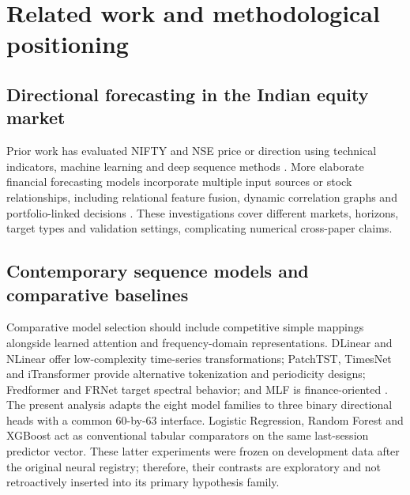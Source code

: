 \documentclass[fleqn,10pt]{wlscirep}
\begin{document}
\section{Related work and methodological positioning}\label{sec:related}
\subsection{Directional forecasting in the Indian equity market}
Prior work has evaluated NIFTY and NSE price or direction using technical indicators, machine learning and deep sequence methods \cite{Paul2023,Agrawal2021,Barua2024,Shastry2024Intraday,Kadu2025SearchRescue}. More elaborate financial forecasting models incorporate multiple input sources or stock relationships, including relational feature fusion, dynamic correlation graphs and portfolio-linked decisions \cite{Ravi2025,Khansama2025SGRNet,Yu2025FFIRNet,Yang2026AsymAlpha,Yang2026ACHGL,Patel2025MR2TNet}. These investigations cover different markets, horizons, target types and validation settings, complicating numerical cross-paper claims.

\subsection{Contemporary sequence models and comparative baselines}
Comparative model selection should include competitive simple mappings alongside learned attention and frequency-domain representations. DLinear and NLinear offer low-complexity time-series transformations; PatchTST, TimesNet and iTransformer provide alternative tokenization and periodicity designs; Fredformer and FRNet target spectral behavior; and MLF is finance-oriented \cite{Zeng2023LTSFLinear,Nie2023PatchTST,Wu2023TimesNet,Liu2024iTransformer,Piao2024Fredformer,Zhang2024FRNet,Zhang2025MLF}. The present analysis adapts the eight model families to three binary directional heads with a common 60-by-63 interface. Logistic Regression, Random Forest and XGBoost act as conventional tabular comparators on the same last-session predictor vector. These latter experiments were frozen on development data after the original neural registry; therefore, their contrasts are exploratory and not retroactively inserted into its primary hypothesis family.
\end{document}
